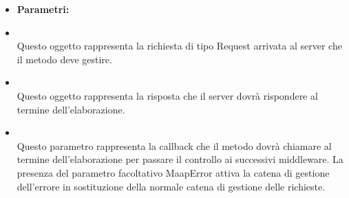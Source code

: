 \begin{itemize}
\begin{itemize}
\item[] \textbf{Parametri:}
\item[]  \\ Questo oggetto rappresenta la richiesta di tipo Request arrivata al server che il metodo deve gestire.
\item[]  \\ Questo oggetto rappresenta la risposta che il server dovrà rispondere al termine dell'elaborazione.
\item[]  \\ Questo parametro rappresenta la callback che il metodo dovrà chiamare al termine dell'elaborazione per passare il controllo ai successivi middleware. La presenza del parametro facoltativo MaapError attiva la catena di gestione dell'errore in sostituzione della normale catena di gestione delle richieste.
\end{itemize}
\end{itemize}

